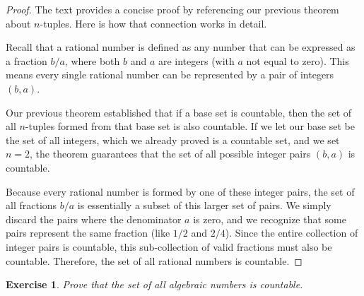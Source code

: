 \documentclass{article}
\theoremstyle{mythm}
\newtheorem{exercise}{Exercise}
\begin{document}
\begin{proof}
The text provides a concise proof by referencing our previous theorem about $n$-tuples. Here is how that connection works in detail.

Recall that a rational number is defined as any number that can be expressed as a fraction $b/a$, where both $b$ and $a$ are integers (with $a$ not equal to zero). This means every single rational number can be represented by a pair of integers $(b, a)$. 

Our previous theorem established that if a base set is countable, then the set of all $n$-tuples formed from that base set is also countable. If we let our base set be the set of all integers, which we already proved is a countable set, and we set $n = 2$, the theorem guarantees that the set of all possible integer pairs $(b, a)$ is countable.

Because every rational number is formed by one of these integer pairs, the set of all fractions $b/a$ is essentially a subset of this larger set of pairs. We simply discard the pairs where the denominator $a$ is zero, and we recognize that some pairs represent the same fraction (like $1/2$ and $2/4$). Since the entire collection of integer pairs is countable, this sub-collection of valid fractions must also be countable. Therefore, the set of all rational numbers is countable.
\end{proof}

\begin{exercise}
Prove that the set of all algebraic numbers is countable.
\end{exercise}
\end{document}

